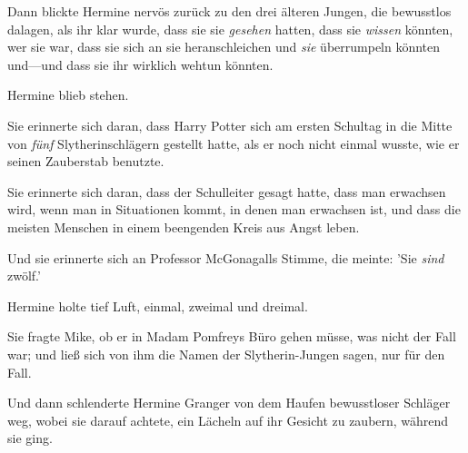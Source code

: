 Dann blickte Hermine nervös zurück zu den drei älteren Jungen, die bewusstlos dalagen, als ihr klar wurde, dass sie sie \emph{gesehen} hatten, dass sie \emph{wissen} könnten, wer sie war, dass sie sich an sie heranschleichen und \emph{sie} überrumpeln könnten und—und dass sie ihr wirklich wehtun könnten.

Hermine blieb stehen.

Sie erinnerte sich daran, dass Harry Potter sich am ersten Schultag in die Mitte von \emph{fünf} Slytherinschlägern gestellt hatte, als er noch nicht einmal wusste, wie er seinen Zauberstab benutzte.

Sie erinnerte sich daran, dass der Schulleiter gesagt hatte, dass man erwachsen wird, wenn man in Situationen kommt, in denen man erwachsen ist, und dass die meisten Menschen in einem beengenden Kreis aus Angst leben.

Und sie erinnerte sich an Professor McGonagalls Stimme, die meinte: 'Sie \emph{sind} zwölf.'

Hermine holte tief Luft, einmal, zweimal und dreimal.

Sie fragte Mike, ob er in Madam Pomfreys Büro gehen müsse, was nicht der Fall war; und ließ sich von ihm die Namen der Slytherin-Jungen sagen, nur für den Fall.

Und dann schlenderte Hermine Granger von dem Haufen bewusstloser Schläger weg, wobei sie darauf achtete, ein Lächeln auf ihr Gesicht zu zaubern, während sie ging.

